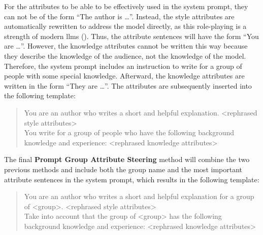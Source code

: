 For the attributes to be able to be effectively used in the system prompt, they can not be of the form \enquote{The author is \ldots}. Instead, the style attributes are automatically rewritten to address the model directly, as this role-playing is a strength of modern \aclp{llm} (\cite{chenPersonaPersonalizationSurvey2024,chenOscarsAITheater2024}).
Thus, the attribute sentences will have the form \enquote{You are \ldots}.
However, the knowledge attributes cannot be written this way because they describe the knowledge of the audience, not the knowledge of the model. Therefore, the system prompt includes an instruction to write for a group of people with some special knowledge. Afterward, the knowledge attributes are written in the form \enquote{They are \ldots}. The attributes are subsequently inserted into the following template:
\begin{quote}
  You are an author who writes a short and helpful explanation. \newline
  <rephrased style attributes> \\[5pt]
  You write for a group of people who have the following background knowledge and experience: \newline
  <rephrased knowledge attributes>
\end{quote}

The final \textbf{Prompt Group Attribute Steering} method will combine the two previous methods and include both the group name and the most important attribute sentences in the system prompt, which results in the following template:

\begin{quote}
  You are an author who writes a short and helpful explanation for a group of <group>. \newline
  <rephrased style attributes> \\[5pt]
  Take into account that the group of <group> has the following background knowledge and experience: \newline
  <rephrased knowledge attributes>
\end{quote}


